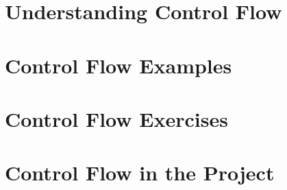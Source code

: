 \clearpage
\def\pageLang{None}
\section{Understanding Control Flow} %
\label{sec:understanding_control_flow}




\clearpage
\section{Control Flow Examples} %
\label{sec:control_flow_examples}




\clearpage
\section{Control Flow Exercises} %
\label{sec:control_flow_exercises}




\clearpage
\section{Control Flow in the Project} %
\label{sec:control_flow_in_the_project}


